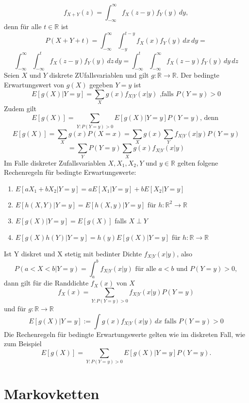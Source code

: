 \documentclass[a4paper,12pt]{article}
\begin{document}
$$
f_{X+Y}(z) = \int_{-\infty}^{\infty} f_{X}(z-y)f_Y(y) \, dy,
$$
denn für alle $t \in \mathbb{R}$ ist
$$
P(X+Y+t) = \int_{-\infty}^{\infty} \int_{-y}^{t-y}f_X(x)f_Y(y) \,dx \,dy =  $$ $$\int_{-\infty}^{\infty} \int_{-\infty}^{t}f_{X}(z-y)f_Y(y) \, dz \,dy = \int_{-\infty}^{t}\int_{-\infty}^{\infty}f_X(z-y)f_Y(y) \, dy \, dz
$$
Seien $X$ und $Y$ diskrete ZUfallsvariablen und gilt $g: \mathbb{R} \to \mathbb{R}$. Der bedingte Erwartungswert von $g(X)$ gegeben $Y=y$ ist 
$$
E[g(X)|Y=y] = \sum_{X}g(x)f_{X|Y}(x|y) \text{ ,falls } P(Y=y) > 0
$$
Zudem gilt
$$
E[g(X)] = \sum_{Y:P(Y=y)>0}E[g(X)|Y=y]P(Y=y) \text{, denn }
$$
$$
E[g(X)] = \sum_{X}g(x)P(X=x) = \sum_{X}g(x) \sum_{Y}f_{X|Y}(x|y)P(Y=y) 
$$
$$
= \sum_{Y}P(Y=y)\sum_{X}g(x)f_{X|Y}(x|y)
$$
Im Falle diskreter Zufallsvariablen $X, X_1, X_2, Y$ und $y \in \mathbb{R}$ gelten folgene Rechenregeln für bedingte Erwartungswerte:
\begin{enumerate}
	\item $E[aX_1 + bX_2 | Y=y] = aE[X_1 |Y=y] + b E[X_2 |Y=y]$
	\item $E[h(X,Y)|Y=y] = E[h(X,y) | Y=y          ]$ für $h: \mathbb{R}^2 \to \mathbb{R}$
	\item $E[g(X)| Y=y] = E[g(X)]$ falls $X \perp Y$
	\item $E[g(X)h(Y)|Y=y] = h(y)E[g(X)|Y=y]$ für $h: \mathbb{R} \to \mathbb{R}$
\end{enumerate}
Ist Y diskret und X stetig mit bedinter Dichte $f_{X|Y}(x|y)$, also
$$
P(a < X < b | Y=y) = \int_{a}^{b}f_{X|Y}(x|y) \text{ für alle } a < b \text{ und } P(Y=y)>0
,$$
dann gilt für die Randdichte $f_X(x)$ von $X$
$$
f_X(x) = \sum_{Y:P(Y=y)>0}f_{X|Y}(x|y)P(Y=y)
$$
und für $g: \mathbb{R} \to \mathbb{R}$
$$
E[g(X)|Y=y]:= \int g(x)f_{X|Y}(x|y) \, dx \text{ falls } P(Y=y) > 0
$$
Die Rechenregeln für bedingte Erwartungswerte gelten wie im diskreten Fall, wie zum Beispiel
$$
E[g(X)] = \sum_{Y:P(Y=y)>0}E[g(X)|Y=y]P(Y=y)
.$$

\section{Markovketten}
\end{document}
